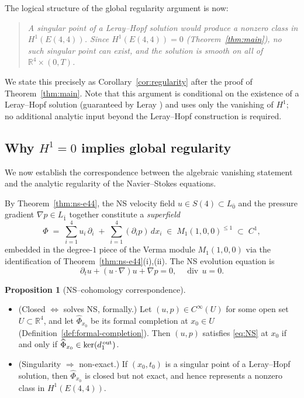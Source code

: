\documentclass[reqno,10pt]{amsart}
\theoremstyle{definition}
\newtheorem{prop}[subsubsection]{Proposition}
\def\Sn{S(4)}
\def\divX{{\operatorname{div}}}
\begin{document}
The logical structure of the global regularity argument is now:

\begin{quote}
\emph{A singular point of a Leray--Hopf solution would produce a
nonzero class in $H^1(E(4,4))$.  Since $H^1(E(4,4))=0$
(Theorem~\ref{thm:main}), no such singular point can exist, and the
solution is smooth on all of $\mathbb{R}^4\times(0,T)$.}
\end{quote}

We state this precisely as Corollary~\ref{cor:regularity} after the proof
of Theorem~\ref{thm:main}.  Note that this argument is conditional on the
existence of a Leray--Hopf solution (guaranteed by Leray \cite{Leray1934})
and uses only the vanishing of $H^1$; no additional analytic input beyond
the Leray--Hopf construction is required.

\subsection{Why $H^1=0$ implies global regularity}

We now establish the correspondence between the algebraic vanishing statement and
the analytic regularity of the Navier--Stokes equations.

By Theorem~\ref{thm:ns-e44}, the NS velocity field
$u\in\Sn\subset L_{\bar 0}$ and the pressure gradient $\nabla p\in L_{\bar 1}$
together constitute a \emph{superfield}
\[
  \Phi \;=\; \sum_{i=1}^4 u_i\,\partial_i \;+\; \sum_{i=1}^4 (\partial_i p)\,dx_i
  \;\in\; M_1(1,0,0)^{\leq 1}\;\subset\; C^1,
\]
embedded in the degree-$1$ piece of the Verma module $M_1(1,0,0)$ via the
identification of Theorem~\ref{thm:ns-e44}(i),(ii).
The NS evolution equation is
\begin{equation}\label{eq:NS}
  \partial_t u + (u\cdot\nabla)u + \nabla p = 0,\quad \divX\, u = 0.
\end{equation}

\begin{prop}[NS--cohomology correspondence]\label{prop:bridge}
\begin{itemize}
\item[(i)] \textup{(Closed $\Leftrightarrow$ solves NS, formally.)}  Let
  $(u,p)\in C^\infty(U)$ for some open set $U\subset\mathbb{R}^4$, and
  let $\widehat{\Phi}_{x_0}$ be its formal completion at $x_0\in U$
  (Definition~\ref{def:formal-completion}).  Then $(u,p)$ satisfies
  \eqref{eq:NS} at $x_0$ if and only if
  $\widehat{\Phi}_{x_0}\in\ker(d_1^{\,\textup{out}})$.
\item[(ii)] \textup{(Singularity $\Rightarrow$ non-exact.)}  If
  $(x_0,t_0)$ is a singular point of a Leray--Hopf solution, then
  $\widehat{\Phi}_{x_0}$ is closed but not exact, and hence represents
  a nonzero class in $H^1(E(4,4))$.
\end{itemize}
\end{prop}
\end{document}
